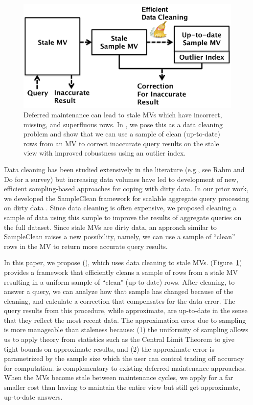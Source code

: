 \begin{figure}[t] \vspace{-2em}
\centering
 \includegraphics[scale=0.27]{figs/sys-arch.pdf} \vspace{-.25em}
 \caption{Deferred maintenance can lead to stale MVs which have incorrect, missing, and superfluous rows. In \svc, we pose this as a data cleaning problem and show that we can use a sample of clean (up-to-date) rows from an MV to correct inaccurate query results on the stale view with improved robustness using an outlier index. \label{sys-arch}}\vspace{-1.75em}
\end{figure}

Data cleaning has been studied extensively in the literature (e.g., see Rahm and Do for a survey\cite{rahm2000data}) but increasing data volumes have led to development of new, efficient sampling-based approaches for coping with dirty data.   
In our prior work, we developed the SampleClean framework for scalable aggregate query processing on dirty data \cite{wang1999sample}.
Since data cleaning is often expensive, we proposed cleaning a sample of data using this sample to improve the results of aggregate queries on the full dataset.
Since stale MVs are dirty data, an approach similar to SampleClean raises a new possibility, namely, we can use a sample of ``clean'' rows in the MV to return more accurate query results.

In this paper, we propose \svcfull (\svc), which uses data cleaning to stale MVs.
\svc (Figure~\ref{sys-arch}) provides a framework that efficiently cleans a sample of rows from a stale MV resulting in a uniform sample of ``clean" (up-to-date) rows.
After cleaning, to answer a query, we can analyze how that sample has changed because of the cleaning, and calculate a correction that compensates for the data error. 
The query results from this procedure, while approximate, are up-to-date in the sense that they reflect the most recent data. 
The approximation error due to sampling is more manageable than staleness because: (1) the uniformity of sampling allows us to apply theory from statistics such as the Central Limit Theorem to give tight bounds on approximate results, and (2) the approximate error is parametrized by the sample size which the user can control trading off accuracy for computation.
\svc is complementary to existing deferred maintenance approaches.
When the MVs become stale between maintenance cycles, we apply \svc for a far smaller cost than having to maintain the entire view but still get approximate, up-to-date answers.

